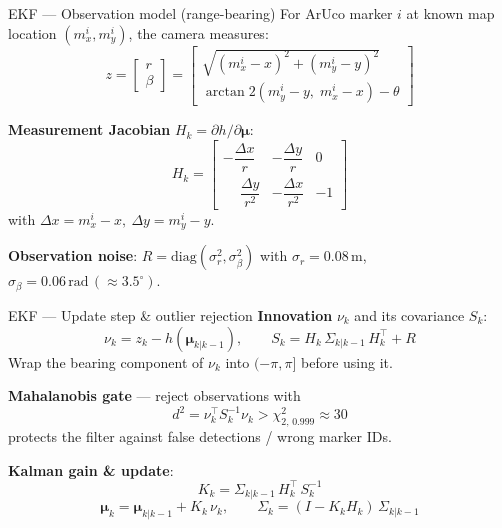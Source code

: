 \documentclass[10pt,aspectratio=169]{beamer}
\begin{document}
\begin{frame}{EKF — Observation model (range-bearing)}
  For ArUco marker $i$ at known map location $(m_x^i, m_y^i)$, the camera measures:
  \[
    z = \begin{bmatrix} r \\ \beta \end{bmatrix} =
    \begin{bmatrix}
      \sqrt{(m_x^i - x)^2 + (m_y^i - y)^2} \\
      \arctan2(m_y^i - y,\; m_x^i - x) - \theta
    \end{bmatrix}
  \]

  \textbf{Measurement Jacobian} $H_k = \partial h / \partial \bm{\mu}$:
  \[
    H_k = \begin{bmatrix}
      -\dfrac{\Delta x}{r} & -\dfrac{\Delta y}{r} & 0 \\[0.6em]
      \phantom{-}\dfrac{\Delta y}{r^2} & -\dfrac{\Delta x}{r^2} & -1
    \end{bmatrix}
  \]
  with $\Delta x = m_x^i - x,\ \Delta y = m_y^i - y$.

  \medskip
  \textbf{Observation noise}: $R = \mathrm{diag}(\sigma_r^2, \sigma_\beta^2)$
  with $\sigma_r = 0.08\,\text{m}$, $\sigma_\beta = 0.06\,\text{rad}\,(\approx 3.5^\circ)$.
\end{frame}

\begin{frame}{EKF — Update step \& outlier rejection}
  \textbf{Innovation} $\nu_k$ and its covariance $S_k$:
  \[
    \nu_k = z_k - h(\bm{\mu}_{k|k-1}), \qquad
    S_k = H_k\, \Sigma_{k|k-1}\, H_k^\top + R
  \]
  Wrap the bearing component of $\nu_k$ into $(-\pi,\pi]$ before using it.

  \medskip
  \textbf{Mahalanobis gate} — reject observations with
  \[
    d^2 = \nu_k^\top S_k^{-1} \nu_k > \chi^2_{2,\,0.999} \approx 30
  \]
  protects the filter against false detections / wrong marker IDs.

  \medskip
  \textbf{Kalman gain \& update}:
  \[
    K_k = \Sigma_{k|k-1}\, H_k^\top\, S_k^{-1}
  \]
  \[
    \bm{\mu}_k = \bm{\mu}_{k|k-1} + K_k\,\nu_k, \qquad
    \Sigma_k = (I - K_k H_k)\,\Sigma_{k|k-1}
  \]
\end{frame}
\end{document}
